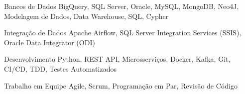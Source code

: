 


\begin{cvskills}


\cvskill
{Bancos de Dados} %
{BigQuery, SQL Server, Oracle, MySQL, MongoDB, Neo4J, Modelagem de Dados, Data Warehouse, SQL, Cypher} %

\cvskill
{Integração de Dados} %
{Apache Airflow, SQL Server Integration Services (SSIS), Oracle Data Integrator (ODI)} %

\cvskill
{Desenvolvimento} %
{Python, REST API, Microsserviços, Docker, Kafka, Git, CI/CD, TDD, Testes Automatizados} %


\cvskill
{Trabalho em Equipe} %
{Agile, Scrum, Programação em Par, Revisão de Código} %


\end{cvskills}